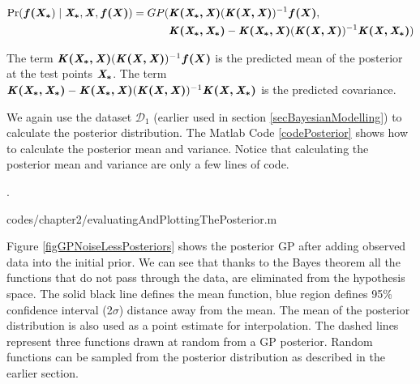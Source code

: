   \begin{equation}\label{eqNoiseFreePosteriorGP}
  \begin{aligned}
  \Pr(\boldsymbol{f(X_{*}}) \mid \bm{\mathit{X_{*}}}, \bm{\mathit{X}}, \boldsymbol{f(X)}) = GP(  & \bm{\mathit{K(X_{*}, X)}}( \bm{\mathit{K(X, X)}} )^{-1}\boldsymbol{f(X)},   \\ 
                                & \bm{\mathit{K(X_{*}, X_{*})}} - \bm{\mathit{K(X_{*}, X)}}( \bm{\mathit{K(X, X)}} )^{-1} \bm{\mathit{K(X, X_{*})}})
  \end{aligned}
  \end{equation}

The term $\bm{\mathit{K(X_{*}, X)}}( \bm{\mathit{K(X, X)}} )^{-1}\boldsymbol{f(X)}$ is the predicted mean of the posterior at the test points $\bm{\mathit{X_{*}}}$. The term $ \bm{\mathit{K(X_{*}, X_{*})}} - \bm{\mathit{K(X_{*}, X)}}( \bm{\mathit{K(X, X)}} )^{-1} \bm{\mathit{K(X, X_{*})}}$ is the predicted covariance. 

We again use the dataset $\mathcal{D}_{1}$ (earlier used in section \ref{secBayesianModelling}) to calculate the posterior distribution. The Matlab Code \ref{codePosterior} shows how to calculate the posterior mean and variance. Notice that calculating the posterior mean and variance are only a few lines of code. 

.%
\begin{mdframed}[hidealllines=true,backgroundcolor=lightgray!20]

                    {codes/chapter2/evaluatingAndPlottingThePosterior.m}
\end{mdframed}

Figure \ref{figGPNoiseLessPosteriors} shows the posterior GP after adding observed data into the initial prior. We can see that thanks to the Bayes theorem all the functions that do not pass through the data, are eliminated from the hypothesis space. The solid black line defines the mean function, blue region defines 95\% confidence interval (2$\sigma$) distance away from the mean. The mean of the posterior distribution is also used as a point estimate for interpolation. The dashed lines represent three functions drawn at random from a GP posterior. Random functions can be sampled from the posterior distribution as described in the earlier section. 


